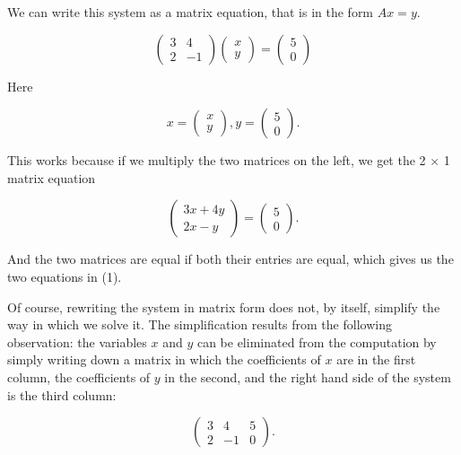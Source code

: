 \documentclass{book}
\begin{document}
We can write this system as a matrix equation, that is in the form $Ax = y$.

\begin{equation} \label{eq3} 
	\begin{pmatrix} 3 & 4 \\ 2 & -1\end{pmatrix} \begin{pmatrix}x \\ y \end{pmatrix} = \begin{pmatrix} 5 \\ 0 \end{pmatrix}
\end{equation}

Here 

\begin{equation} \label{eq}
	x = \begin{pmatrix} x \\ y \end{pmatrix}, y = \begin{pmatrix} 5 \\ 0 \end{pmatrix} . \nonumber
\end{equation}

This works because if we multiply the two matrices on the left, we get the 2 $\times$ 1 matrix equation

\begin{equation} \label{eq}
	\begin{pmatrix} 3x + 4y \\ 2x - y\end{pmatrix} = \begin{pmatrix} 5 \\ 0\end{pmatrix}. \nonumber
\end{equation} 

And the two matrices are equal if both their entries are equal, which gives us the two equations in (1).

Of course, rewriting the system in matrix form does not, by itself, simplify the way in which we solve it. The simplification results from the following observation: the variables $x$ and $y$ can be eliminated from the computation by simply writing down a matrix in which the coefficients of $x$ are in the first column, the coefficients of $y$ in the second, and the right hand side of the system is the third column:

\begin{equation}\label{eq}
	\begin{pmatrix} 3 & 4 & 5 \\ 2 & -1 & 0 \end{pmatrix}. 
\end{equation}
\end{document}
